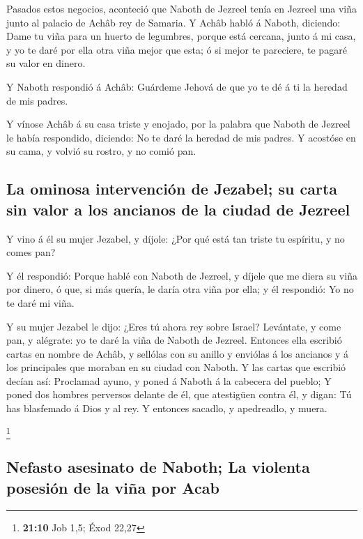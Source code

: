  Pasados estos negocios, aconteció que Naboth de Jezreel
tenía en Jezreel una viña junto al palacio de Achâb rey de Samaria.
 Y Achâb habló á Naboth, diciendo: Dame tu viña para un
huerto de legumbres, porque está cercana, junto á mi casa, y yo te daré
por ella otra viña mejor que esta; ó si mejor te pareciere, te pagaré su
valor en dinero.

 Y Naboth respondió á Achâb: Guárdeme Jehová de que yo te dé
á ti la heredad de mis padres.

 Y vínose Achâb á su casa triste y enojado, por la palabra
que Naboth de Jezreel le había respondido, diciendo: No te daré la
heredad de mis padres. Y acostóse en su cama, y volvió su rostro, y no
comió pan.

\hypertarget{la-ominosa-intervenciuxf3n-de-jezabel-su-carta-sin-valor-a-los-ancianos-de-la-ciudad-de-jezreel}{%
\subsection{La ominosa intervención de Jezabel; su carta sin valor a los
ancianos de la ciudad de
Jezreel}\label{la-ominosa-intervenciuxf3n-de-jezabel-su-carta-sin-valor-a-los-ancianos-de-la-ciudad-de-jezreel}}

 Y vino á él su mujer Jezabel, y díjole: ¿Por qué está tan
triste tu espíritu, y no comes pan?

 Y él respondió: Porque hablé con Naboth de Jezreel, y
díjele que me diera su viña por dinero, ó que, si más quería, le daría
otra viña por ella; y él respondió: Yo no te daré mi viña.

 Y su mujer Jezabel le dijo: ¿Eres tú ahora rey sobre
Israel? Levántate, y come pan, y alégrate: yo te daré la viña de Naboth
de Jezreel.  Entonces ella escribió cartas en nombre de
Achâb, y sellólas con su anillo y enviólas á los ancianos y á los
principales que moraban en su ciudad con Naboth.  Y las
cartas que escribió decían así: Proclamad ayuno, y poned á Naboth á la
cabecera del pueblo;  Y poned dos hombres perversos delante
de él, que atestigüen contra él, y digan: Tú has blasfemado á Dios y al
rey. Y entonces sacadlo, y apedreadlo, y muera.

\footnote{\textbf{21:10} Job 1,5; Éxod 22,27}

\hypertarget{nefasto-asesinato-de-naboth-la-violenta-posesiuxf3n-de-la-viuxf1a-por-acab}{%
\subsection{Nefasto asesinato de Naboth; La violenta posesión de la viña
por
Acab}\label{nefasto-asesinato-de-naboth-la-violenta-posesiuxf3n-de-la-viuxf1a-por-acab}}


